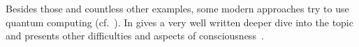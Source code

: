 Besides those and countless other examples, some modern approaches try to use quantum computing (cf.~\cite{saxena2013}).
In  \citeauthor{Meissner2020} gives a very well written deeper dive into the topic and presents other difficulties and aspects of consciousness~\cite{Meissner2020}.
